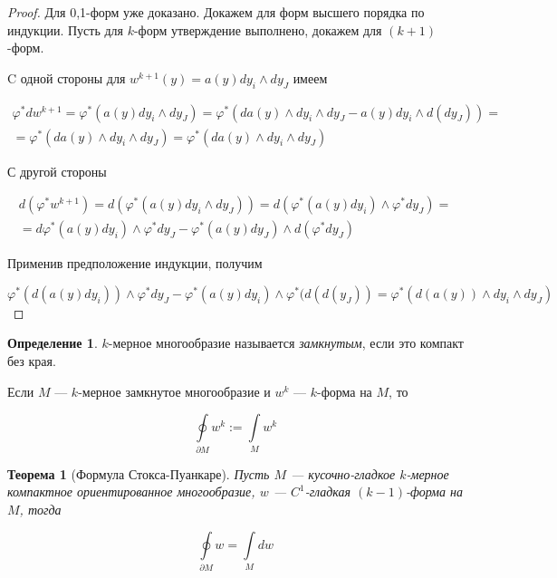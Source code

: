 \documentclass[a5paper]{article}
\newcounter{through}
\theoremstyle{plain}
\newtheorem{theorem}[through]{Теорема}
\theoremstyle{definition}
\newtheorem{definition}[through]{Определение}
\numberwithin{through}{section}
\numberwithin{equation}{section}
\begin{document}
\begin{proof}
	Для 0,1-форм уже доказано. Докажем для форм высшего порядка по индукции.
	Пусть для $k$-форм утверждение выполнено, докажем для $(k+1)$-форм.
	
	C одной стороны для $w^{k+1} (y) = a(y) dy_i \wedge dy_J$ имеем
	
	\begin{multline*}
		\varphi^* d w^{k+1} = \varphi^* (a(y) dy_i \wedge dy_J) = \varphi^*(da(y) \wedge dy_i \wedge dy_J - a(y) dy_i \wedge d(dy_J)) = \\ = \varphi^* (da(y) \wedge dy_i \wedge dy_J) = \varphi^* (da(y) \wedge dy_i \wedge dy_J)
	\end{multline*}
	
	С другой стороны
	
	\begin{multline*}
		d(\varphi^* w^{k+1}) = d(\varphi^* (a(y) dy_i \wedge dy_J)) = d(\varphi^* (a(y) dy_i) \wedge \varphi^* dy_J) = \\ = d\varphi^* (a(y) dy_i) \wedge \varphi^* dy_J - \varphi^* (a(y) dy_J) \wedge d(\varphi^* dy_J)
	\end{multline*}
	
	Применив предположение индукции, получим
		
	\begin{equation*}
	\varphi^* (d(a(y) dy_i)) \wedge \varphi^* dy_J - \varphi^* (a(y) dy_i) \wedge \varphi^* (d(d(y_J)) = \varphi^* (d(a(y)) \wedge dy_i \wedge dy_J)
	\end{equation*}
\end{proof}

\begin{definition}
	$k$-мерное многообразие называется \textit{замкнутым}, если это компакт без края.
\end{definition}

Если $M$ --- $k$-мерное замкнутое многообразие и $w^k$ --- $k$-форма на $M$, то

\begin{equation*}
	\oint\limits_{\partial M} w^k := \int\limits_{M} w^k %
\end{equation*}

\begin{theorem}[Формула Стокса-Пуанкаре]
	Пусть $M$ --- кусочно-гладкое $k$-мерное компактное ориентированное многообразие, $w$ --- $C^1$-гладкая $(k-1)$-форма на $M$, тогда
	
	\begin{equation*}
	\oint\limits_{\partial M} w = \int\limits_{M} dw
	\end{equation*}
\end{theorem}
\end{document}
